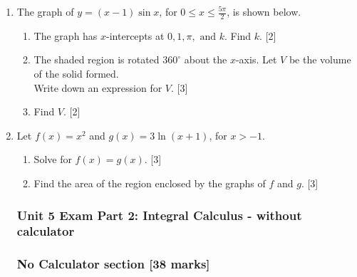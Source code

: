\documentclass[12pt, twoside]{article}
\begin{document}
\begin{enumerate}
\item The graph of $y=(x-1)\sin x$, for $0 \leq x \leq \frac{5 \pi}{2}$, is shown below.
      \begin{center}
      \end{center}
      \begin{enumerate}
        \item The graph has $x$-intercepts at $0,1, \pi, \text{ and }k$.
          Find $k$. \hfill [2]
        \item The shaded region is rotated $360^\circ$ about the $x$-axis. Let $V$ be the volume of the solid formed.\\
        Write down an expression for $V$. \hfill [3]
        \item Find $V$.  \hfill [2]
  \end{enumerate}


\item Let $f(x)=x^2$ and $g(x)=3 \ln(x+1)$, for $x > -1$.

  \begin{enumerate}
    \item Solve for $f(x)=g(x)$. \hfill [3]
    \item Find the area of the region enclosed by the graphs of $f$ and $g$.  \hfill [3]
  \end{enumerate}


\newpage
\subsubsection*{Unit 5 Exam Part 2: Integral Calculus - without calculator}
\subsubsection*{No Calculator section \hfill [38 marks]}


\end{enumerate}
\end{document}
